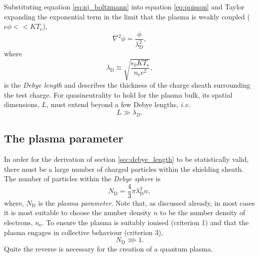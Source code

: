 Substituting equation \ref{eq:nj_boltzmann} into equation \ref{eq:poisson} and Taylor expanding the exponential term in the limit that the plasma is weakly coupled ($e\phi << KT_\mathrm{e}$), 
\begin{equation}\label{eq:poisson_debye2}
	\nabla^2\phi = \frac{\phi}{\lambda_\mathrm{D}^2},
\end{equation}
where
\begin{equation}\label{eq:debye}
	\lambda_\mathrm{D} \equiv \sqrt{\frac{\epsilon_0KT_\mathrm{e}}{n_\mathrm{e}e^2}},
\end{equation}
is the \textit{Debye length} and describes the thickness of the charge sheath surrounding the test charge. For quasineutrality to hold for the plasma bulk, its spatial dimensions, $L$, must extend beyond a few Debye lengths, \textit{i.e.}
\begin{equation}
	L \gg \lambda_D.
\end{equation}

\subsection{\label{sec:plasma_parameter}The plasma parameter}
In order for the derivation of section \ref{sec:debye_length} to be statistically valid, there must be a large number of charged particles within the shielding sheath. The number of particles within the \textit{Debye sphere} is
\begin{equation}\label{eq:plasma_parameter}
	N_\mathrm{D} = \frac{4}{3}\pi\lambda_\mathrm{D}^3n,
\end{equation}
where, $N_\mathrm{D}$ is the \textit{plasma parameter}. Note that, as discussed already, in most cases it is most suitable to choose the number density $n$ to be the number density of electrons, $n_\mathrm{e}$. To ensure the plasma is suitably ionised (criterion 1) and that the plasma engages in collective behaviour (criterion 3),
\begin{equation}\label{eq:plasma_parameter_condition}
	N_\mathrm{D} \ggg 1.
\end{equation}
Quite the reverse is necessary for the creation of a quantum plasma.

